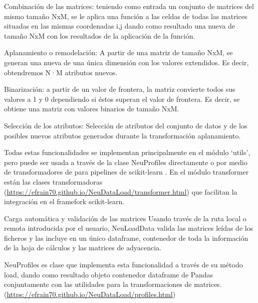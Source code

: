 Combinación de las matrices: teniendo como entrada un conjunto de matrices del mismo tamaño NxM, se le aplica una función a las celdas de todas las matrices situadas en las mismas coordenadas i,j dando como resultado una nueva de tamaño NxM con los resultados de la aplicación de la función.

Aplanamiento o remodelación: A partir de una matriz de tamaño NxM, se generan una nueva de una única dimensión con los valores extendidos. Es decir, obtendremos N·M atributos nuevos.

Binarización: a partir de un valor de frontera, la matriz convierte todos sus valores a 1 y 0 dependiendo si éstos superan el valor de frontera. Es decir, se obtiene una matriz con valores binarios de tamaño NxM.

Selección de los atributos: Selección de atributos del conjunto de datos y de los posibles nuevos atributos generados durante la transformación aplanamiento. 

Todas estas funcionalidades se implementan principalmente en el módulo ‘utils’, pero puede ser usada a través de la clase NeuProfiles directamente o por medio de transformadores de para pipelines de scikit-learn \cite{Scikit-learn:Documentation}. En el módulo transformer están las clases transformadoras (\url{https://efrain70.github.io/NeuDataLoad/transformer.html}) que facilitan la integración en el framefork scikit-learn.

Carga automática y validación de las matrices
Usando través de la ruta local o remota introducida por el usuario, NeuLoadData valida las matrices leídas de los ficheros y las incluye en un único dataframe, contenedor de toda la información de la hoja de cálculos y las matrices de adyacencia.

NeuProfiles es clase que implementa esta funcionalidad a través de su método load, dando como resultado objeto contenedor dataframe de Pandas \cite{PythonLibrary} conjuntamente con las utilidades para la transformaciones de matrices. (\url{https://efrain70.github.io/NeuDataLoad/profiles.html})

